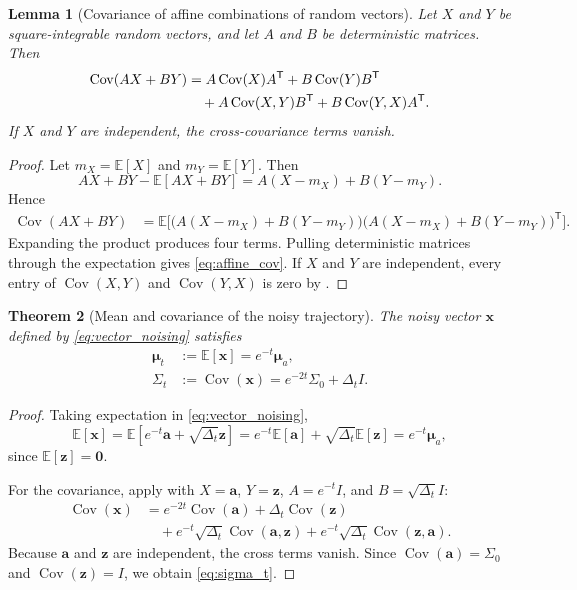 \documentclass[11pt]{article}
\numberwithin{equation}{section}
\newtheorem{theorem}{Theorem}[section]
\newtheorem{lemma}[theorem]{Lemma}
\theoremstyle{definition}
\theoremstyle{remark}
\newcommand{\E}{\mathbb{E}}
\newcommand{\Cov}{\operatorname{Cov}}
\newcommand{\Id}{I}
\newcommand{\trans}{\mathsf{T}}
\begin{document}
\begin{lemma}[Covariance of affine combinations of random vectors]\label{lem:affine_cov}
Let $X$ and $Y$ be square-integrable random vectors, and let $A$ and $B$ be deterministic matrices. Then
\begin{align}
\Cov(AX+BY)
&=
A\Cov(X)A^\trans + B\Cov(Y)B^\trans \notag\\
&\quad +A\Cov(X,Y)B^\trans + B\Cov(Y,X)A^\trans. \label{eq:affine_cov}
\end{align}
If $X$ and $Y$ are independent, the cross-covariance terms vanish.
\end{lemma}

\begin{proof}
Let $m_X=\E[X]$ and $m_Y=\E[Y]$. Then
\[
AX+BY-\E[AX+BY]=A(X-m_X)+B(Y-m_Y).
\]
Hence
\begin{align*}
\Cov(AX+BY)
&=
\E\Big[\big(A(X-m_X)+B(Y-m_Y)\big)\big(A(X-m_X)+B(Y-m_Y)\big)^\trans\Big].
\end{align*}
Expanding the product produces four terms. Pulling deterministic matrices through the expectation gives \eqref{eq:affine_cov}. If $X$ and $Y$ are independent, every entry of $\Cov(X,Y)$ and $\Cov(Y,X)$ is zero by .
\end{proof}

\begin{theorem}[Mean and covariance of the noisy trajectory]\label{thm:sigmat}
The noisy vector $\mathbf x$ defined by \eqref{eq:vector_noising} satisfies
\begin{align}
\boldsymbol{\mu}_t &:= \E[\mathbf x]=e^{-t}\boldsymbol{\mu}_a, \label{eq:mu_t}\\
\Sigma_t &:= \Cov(\mathbf x)=e^{-2t}\Sigma_0+\Delta_t\Id. \label{eq:sigma_t}
\end{align}
\end{theorem}

\begin{proof}
Taking expectation in \eqref{eq:vector_noising},
\[
\E[\mathbf x]=\E[e^{-t}\mathbf a+\sqrt{\Delta_t}\mathbf z]
=e^{-t}\E[\mathbf a]+\sqrt{\Delta_t}\E[\mathbf z]
=e^{-t}\boldsymbol{\mu}_a,
\]
since $\E[\mathbf z]=\mathbf 0$.

For the covariance, apply  with $X=\mathbf a$, $Y=\mathbf z$, $A=e^{-t}\Id$, and $B=\sqrt{\Delta_t}\Id$:
\begin{align*}
\Cov(\mathbf x)
&=e^{-2t}\Cov(\mathbf a)+\Delta_t\Cov(\mathbf z)\\
&\quad + e^{-t}\sqrt{\Delta_t}\Cov(\mathbf a,\mathbf z)
+ e^{-t}\sqrt{\Delta_t}\Cov(\mathbf z,\mathbf a).
\end{align*}
Because $\mathbf a$ and $\mathbf z$ are independent, the cross terms vanish. Since $\Cov(\mathbf a)=\Sigma_0$ and $\Cov(\mathbf z)=\Id$, we obtain \eqref{eq:sigma_t}.
\end{proof}
\end{document}
